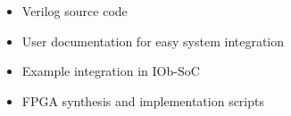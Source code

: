\begin{itemize}
\item Verilog source code
\item User documentation for easy system integration
\item Example integration in IOb-SoC
\item FPGA synthesis and implementation scripts
\end{itemize}
